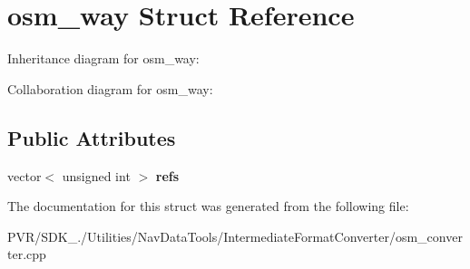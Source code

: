 \hypertarget{structosm__way}{\section{osm\+\_\+way Struct Reference}
\label{structosm__way}
}


Inheritance diagram for osm\+\_\+way\+:


Collaboration diagram for osm\+\_\+way\+:
\subsection*{Public Attributes}
\begin{DoxyCompactItemize}
\item 
\hypertarget{structosm__way_ad9ad8616020f8bd2ec8cc3b20ee0e81e}{vector$<$ unsigned int $>$ {\bfseries refs}}\label{structosm__way_ad9ad8616020f8bd2ec8cc3b20ee0e81e}

\end{DoxyCompactItemize}


The documentation for this struct was generated from the following file\+:\begin{DoxyCompactItemize}
\item 
P\+V\+R/\+S\+D\+K\+\_./\+Utilities/\+Nav\+Data\+Tools/\+Intermediate\+Format\+Converter/osm\+\_\+converter.\+cpp\end{DoxyCompactItemize}
